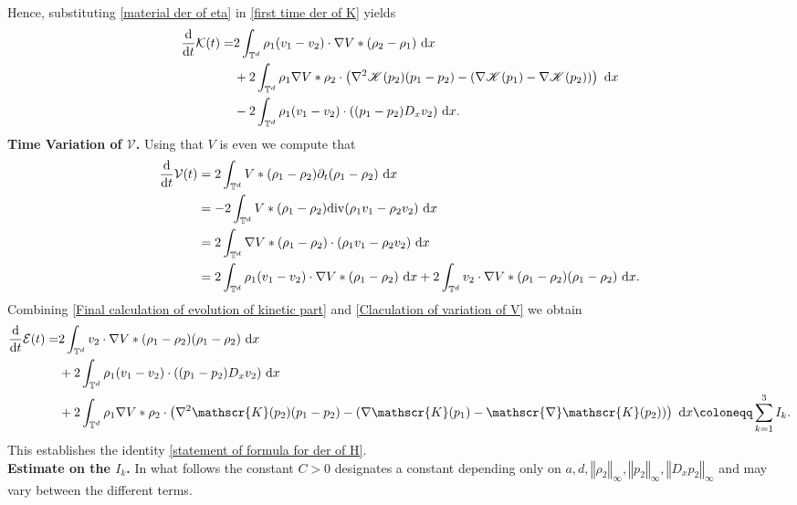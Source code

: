 \documentclass[11pt,reqno]{amsart}
\numberwithin{equation}{section}
\def\dd{{\rm d}}
\begin{document}
Hence, substituting \eqref{material der of eta} in  \eqref{first time der of K} yields  
\begin{align}
\frac{\dd}{\dd t}\mathcal{K}(t)=&2\int_{\mathbb{T}^{d}}\rho_{1}(v_{1}-v_{2})\cdot \nabla V\ast (\rho_{2}-\rho_{1})\ \dd x \notag\\
&+2\int_{\mathbb{T}^{d}}\rho_{1}\nabla V\ast \rho_{2}\cdot \left(\nabla^{2}\mathscr{K}(p_{2})(p_{1}-p_{2})-(\nabla \mathscr{K}(p_{1})-\mathscr{\nabla}\mathscr{K}(p_{2}))\right)\ \dd x \notag\\
&-2\int_{\mathbb{T}^{d}}\rho_{1}(v_{1}-v_{2})\cdot ((p_{1}-p_{2})D_{x}v_{2})\ \dd x. \label{Final calculation of evolution of kinetic part}   
\end{align}
\textbf{Time Variation of $\mathcal{V}$.} Using that $V$ is even we compute that 
\begin{align}
\frac{\dd}{\dd t}\mathcal{V}(t)&=2\int_{\mathbb{T}^{d}} V\ast (\rho_{1}-\rho_{2})\partial_{t}(\rho_{1}-\rho_{2})\ \dd x \notag\\ 
&=-2\int_{\mathbb{T}^{d}} V\ast (\rho_{1}-\rho_{2})\mathrm{div}(\rho_{1}v_{1}-\rho_{2}v_{2})\ \dd x \notag\\
&=2\int_{\mathbb{T}^{d}} \nabla V\ast (\rho_{1}-\rho_{2})\cdot(\rho_{1}v_{1}-\rho_{2}v_{2})\ \dd x \notag\\
&=2\int_{\mathbb{T}^{d}} \rho_{1}(v_{1}-v_{2})\cdot \nabla V\ast (\rho_{1}-\rho_{2})\ \dd x+2\int_{\mathbb{T}^{d}} v_{2}\cdot \nabla V\ast (\rho_{1}-\rho_{2})(\rho_{1}-\rho_{2})\ \dd x.  
\label{Claculation of variation of V}
\end{align}
Combining \eqref{Final calculation of evolution of kinetic part} and \eqref{Claculation of variation of V} we obtain 
\begin{align*}
\frac{\dd}{\dd t}\mathcal{E}(t)=&2\int_{\mathbb{T}^{d}} v_{2}\cdot \nabla V\ast (\rho_{1}-\rho_{2})(\rho_{1}-\rho_{2})\ \dd x\\
&+2\int_{\mathbb{T}^{d}}\rho_{1}(v_{1}-v_{2})\cdot ((p_{1}-p_{2})D_{x}v_{2})\ \dd x\\
&+2\int_{\mathbb{T}^{d}}\rho_{1}\nabla V\ast \rho_{2}\cdot \left(\nabla^{2}\mathscr{K}(p_{2})(p_{1}-p_{2})-(\nabla \mathscr{K}(p_{1})-\mathscr{\nabla}\mathscr{K}(p_{2}))\right)\ \dd x \coloneqq \sum_{k=1}^{3}I_{k}.     
\end{align*}
This establishes the identity \eqref{statement of formula for der of H}.\\
\textbf{Estimate on the  $I_{k}$.} In what follows the constant $C>0$ designates a constant depending only on $a,d,\left\Vert \rho_{2}\right\Vert_{\infty} ,\left\Vert p_{2}\right\Vert_{\infty}, \left\Vert D_{x}p_{2}\right\Vert_{\infty}$ and may vary between the different terms. 
\end{document}
